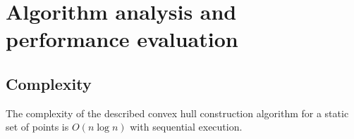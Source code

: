 \documentclass[a4paper,english,numberwithinsect,notab]{eurocg20-submission}
\begin{document}
\section{Algorithm analysis and performance evaluation}
\label{sec:algorithm-analysis-and-performance-evaluation}
\subsection{Complexity}



	\begin{theorem}
		The complexity of the described convex hull construction algorithm for a static set of points is $O(n\log n)$ with sequential execution.
	\end{theorem}
	
\end{document}
